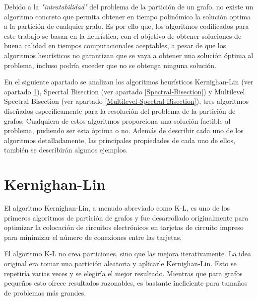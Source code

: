 Debido a la \textit{"intratabilidad"} del problema de la partición de un grafo, no existe un algoritmo concreto que permita obtener en tiempo polinómico la solución optima a la partición de cualquier grafo. Es por ello que, los algoritmos codificados para este trabajo se basan en la heurística, con el objetivo de obtener soluciones de buena calidad en tiempos computacionales aceptables, a pesar de que los algoritmos heurísticos no garantizan que se vaya a obtener una solución óptima al problema, incluso podría suceder que no se obtenga ninguna solución. 

En el siguiente apartado se analizan los algoritmos heurísticos Kernighan-Lin\cite{KernighanLin} (ver apartado \ref{Kernighan-Lin}), Specrtal Bisection (ver apartado \ref{Spectral-Bisection}) y Multilevel Spectral Bisection (ver apartado \ref{Multilevel-Spectral-Bisection}), tres algoritmos diseñados específicamente para la resolución del problema de la partición de grafos. Cualquiera de estos algoritmos proporciona una solución factible al problema, pudiendo ser esta óptima o no. Además de describir cada uno de los algoritmos detalladamente, las principales propiedades de cada uno de ellos, también se describirán algunos ejemplos.

\section{Kernighan-Lin}\label{Kernighan-Lin}


El algoritmo Kernighan-Lin\cite{KernighanLin}, a menudo abreviado como K-L, es uno de los primeros algoritmos de partición de grafos y fue desarrollado originalmente para optimizar la colocación de circuitos electrónicos en tarjetas de circuito impreso para minimizar el número de conexiones entre las tarjetas.

El algoritmo K-L no crea particiones, sino que las mejora iterativamente. La idea original era tomar una partición aleatoria y aplicarle Kernighan-Lin\cite{KernighanLin}. Esto se repetiría varias veces y se elegiría el mejor resultado. Mientras que para grafos pequeños esto ofrece resultados razonables, es bastante ineficiente para tamaños de problemas más grandes.

